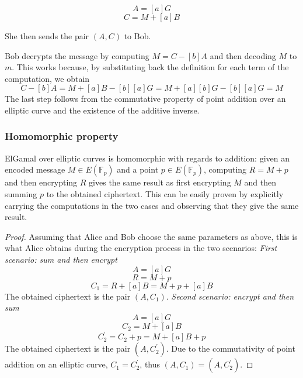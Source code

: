 \documentclass{report}
\begin{document}
$$A=[a]G$$
$$C=M+[a]B$$

She then sends the pair $(A, C)$ to Bob. \newline
\par
Bob decrypts the message by computing $M=C-[b]A$ and then decoding $M$ to $m$. This works because, by substituting back the definition for each term of the computation, we obtain
		$$C-[b]A=M+[a]B-[b][a]G=M+[a][b]G-[b][a]G=M$$ 
The last step follows from the commutative property of point addition over an elliptic curve and the existence of the additive inverse.

\subsubsection{Homomorphic property}
ElGamal over elliptic curves is homomorphic with regards to addition: given an encoded message $M \in E(\mathds{F}_p)$ and a point $p \in E(\mathds{F}_p)$, computing $R=M+p$ and
then encrypting $R$ gives the same result as first encrypting $M$ and then summing $p$ to the obtained ciphertext. This can be easily proven by explicitly carrying the computations
in the two cases and observing that they give the same result.

\begin{proof}
Assuming that Alice and Bob choose the same parameters as above, this is what Alice obtains during the encryption process in the two scenarios:
\newline \newline
\textit{First scenario: sum and then encrypt}
$$A=[a]G$$
$$R=M+p$$
$$C_1=R+[a]B=M+p+[a]B$$ 
The obtained ciphertext is the pair $(A, C_1)$.
\newline \newline
\textit{Second scenario: encrypt and then sum}
$$A=[a]G$$
$$C_2=M+[a]B$$
$$C_2^{'}=C_2+p=M+[a]B+p$$
The obtained ciphertext is the pair $(A, C_2^{'})$.
\newline \newline
Due to the commutativity of point addition on an elliptic curve, $C_1=C_2^{'}$, thus $(A, C_1)=(A, C_2^{'})$.
\end{proof}
\end{document}
